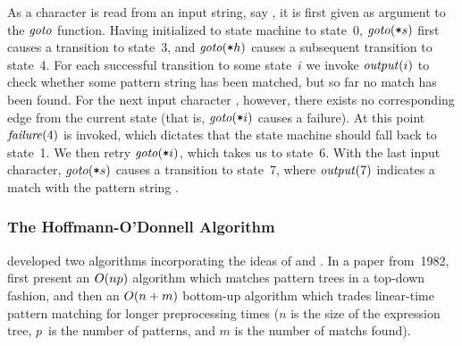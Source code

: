 %
As a character is read from an input string, say , it is first
given as argument to the $\textrm{\textit{goto}}$ function.
%
Having initialized to \gls{state machine} to state~\num{0},
$\textrm{\textit{goto}}(\mbox{\texttt{*}}{s})$ first causes a transition to state~\num{3}, and
$\textrm{\textit{goto}}(\mbox{\texttt{*}}{h})$ causes a subsequent transition to state~\num{4}.
%
For each successful transition to some state~$i$ we invoke
$\textrm{\textit{output}}(i)$ to check whether some \gls{pattern} string has been
matched, but so far no \gls{match} has been found.
%
For the next input character , however, there exists no corresponding
\gls{edge} from the current state (that is, $\textrm{\textit{goto}}(\mbox{\texttt{*}}{i})$ causes
a failure).
%
At this point $\textrm{\textit{failure}}(4)$ is invoked, which dictates that the
\gls{state machine} should fall back to state~\num{1}.
%
We then retry $\textrm{\textit{goto}}(\mbox{\texttt{*}}{i})$, which takes us to state~\num{6}.
%
With the last input character, $\textrm{\textit{goto}}(\mbox{\texttt{*}}{s})$ causes a transition
to state~\num{7}, where $\textrm{\textit{output}}(7)$ indicates a \gls{match} with the
\gls{pattern} string .


\subsubsection{The Hoffmann-O'Donnell Algorithm}

\textcite{HoffmannODonnell:1982} developed two algorithms incorporating the
ideas of \citeauthor{AhoCorasick:1975} and \citeauthor{KnuthEtAl:1977}.
%
In a paper from~1982, \citeauthor{HoffmannODonnell:1982} first present an
\mbox{$O(np)$} algorithm which matches \glspl{pattern tree} in a top-down
fashion, and then an \mbox{$O(n+m)$} bottom-up algorithm which trades
linear-time \gls{pattern matching} for longer preprocessing times ($n$ is the
size of the \gls{expression tree}, $p$~is the number of \glspl{pattern}, and $m$
is the number of \glspl{match} found).

